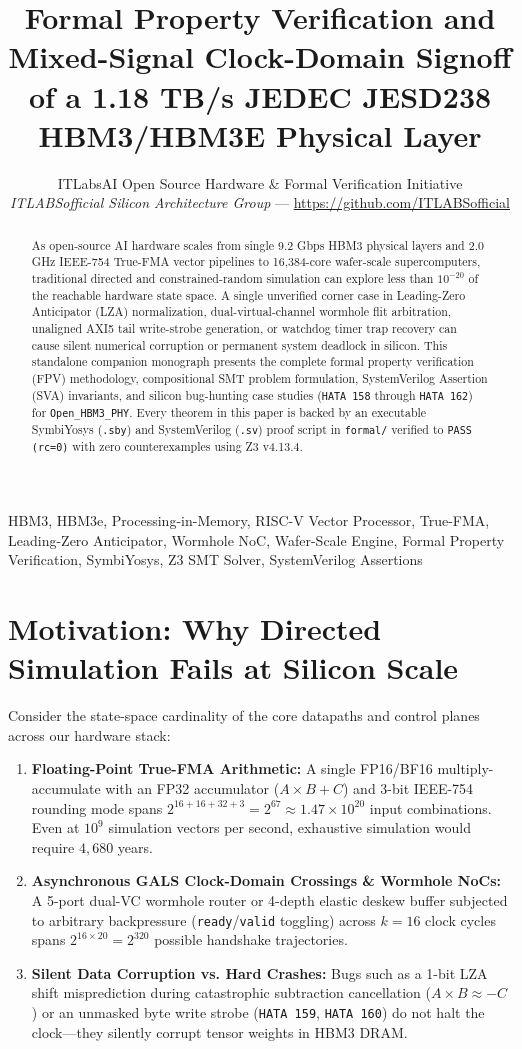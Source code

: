 \documentclass[journal,10pt,twocolumn]{IEEEtran}
\title{Formal Property Verification and Mixed-Signal Clock-Domain Signoff of a 1.18 TB/s JEDEC JESD238 HBM3/HBM3E Physical Layer}
\author{ITLabsAI Open Source Hardware \& Formal Verification Initiative\\
\textit{ITLABSofficial Silicon Architecture Group} --- \url{https://github.com/ITLABSofficial}}
\begin{document}
\maketitle
\begin{abstract}
As open-source AI hardware scales from single 9.2 Gbps HBM3 physical layers and 2.0 GHz IEEE-754 True-FMA vector pipelines to 16,384-core wafer-scale supercomputers, traditional directed and constrained-random simulation can explore less than $10^{-20}$ of the reachable hardware state space. A single unverified corner case in Leading-Zero Anticipator (LZA) normalization, dual-virtual-channel wormhole flit arbitration, unaligned AXI5 tail write-strobe generation, or watchdog timer trap recovery can cause silent numerical corruption or permanent system deadlock in silicon. This standalone companion monograph presents the complete formal property verification (FPV) methodology, compositional SMT problem formulation, SystemVerilog Assertion (SVA) invariants, and silicon bug-hunting case studies (\texttt{HATA 158} through \texttt{HATA 162}) for \texttt{Open\_HBM3\_PHY}. Every theorem in this paper is backed by an executable SymbiYosys (\texttt{.sby}) and SystemVerilog (\texttt{.sv}) proof script in \texttt{formal/} verified to \texttt{PASS (rc=0)} with zero counterexamples using Z3 v4.13.4.
\end{abstract}
\begin{IEEEkeywords}
HBM3, HBM3e, Processing-in-Memory, RISC-V Vector Processor, True-FMA, Leading-Zero Anticipator, Wormhole NoC, Wafer-Scale Engine, Formal Property Verification, SymbiYosys, Z3 SMT Solver, SystemVerilog Assertions
\end{IEEEkeywords}


\section{Motivation: Why Directed Simulation Fails at Silicon Scale}

Consider the state-space cardinality of the core datapaths and control planes across our hardware stack:
\begin{enumerate}
  \item \textbf{Floating-Point True-FMA Arithmetic:} A single FP16/BF16 multiply-accumulate with an FP32 accumulator ($A \times B + C$) and 3-bit IEEE-754 rounding mode spans $2^{16+16+32+3} = 2^{67} \approx 1.47 \times 10^{20}$ input combinations. Even at $10^9$ simulation vectors per second, exhaustive simulation would require $4,680$ years.
  \item \textbf{Asynchronous GALS Clock-Domain Crossings \& Wormhole NoCs:} A 5-port dual-VC wormhole router or 4-depth elastic deskew buffer subjected to arbitrary backpressure (\texttt{ready}/\texttt{valid} toggling) across $k=16$ clock cycles spans $2^{16 \times 20} = 2^{320}$ possible handshake trajectories.
  \item \textbf{Silent Data Corruption vs. Hard Crashes:} Bugs such as a 1-bit LZA shift misprediction during catastrophic subtraction cancellation ($A \times B \approx -C$) or an unmasked byte write strobe (\texttt{HATA 159}, \texttt{HATA 160}) do not halt the clock—they silently corrupt tensor weights in HBM3 DRAM.
\end{enumerate}
\end{document}
